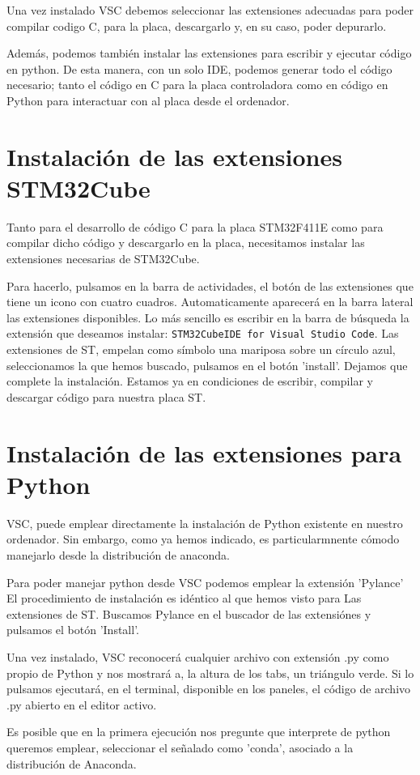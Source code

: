Una vez instalado VSC debemos seleccionar las extensiones adecuadas para poder compilar codigo C, para la placa, descargarlo y, en su caso, poder depurarlo.

Además, podemos también instalar las extensiones para escribir y ejecutar código en python. De esta manera, con un solo IDE, podemos generar todo el código necesario; tanto el código en C para la placa controladora como en código en Python para interactuar con al placa desde el ordenador.

\section{Instalación de las extensiones STM32Cube}
Tanto para el desarrollo de código C para la placa STM32F411E como para compilar dicho código y descargarlo en la placa, necesitamos instalar las extensiones necesarias de STM32Cube.

Para hacerlo, pulsamos en la barra de actividades, el botón de las extensiones que tiene un icono con cuatro cuadros. Automaticamente aparecerá en la barra lateral las extensiones disponibles. Lo más sencillo es escribir en la barra de búsqueda la extensión que deseamos instalar: \texttt{STM32CubeIDE for Visual Studio Code}. Las extensiones de ST, empelan como símbolo una mariposa sobre un círculo azul, seleccionamos la que hemos buscado, pulsamos en el botón 'install'. Dejamos que complete la instalación. Estamos ya en condiciones de escribir, compilar y descargar código para nuestra placa ST.

\section{Instalación de las extensiones para Python}
VSC, puede emplear directamente la instalación de Python existente en nuestro ordenador. Sin embargo, como ya hemos indicado, es particularmnente cómodo manejarlo desde la distribución de anaconda.

Para poder manejar python desde VSC podemos emplear la extensión 'Pylance' El procedimiento de instalación es idéntico al que hemos visto para Las extensiones de ST. Buscamos Pylance en el buscador de las extensiónes y pulsamos el botón 'Install'.

Una vez instalado, VSC reconocerá cualquier archivo con extensión .py como propio de Python y nos mostrará a, la altura de los tabs, un triángulo verde. Si lo pulsamos ejecutará, en el terminal, disponible en los paneles, el código de archivo .py abierto en el editor activo.

Es posible que en la primera ejecución nos pregunte que interprete de python queremos emplear, seleccionar el señalado como 'conda', asociado a la distribución de Anaconda.